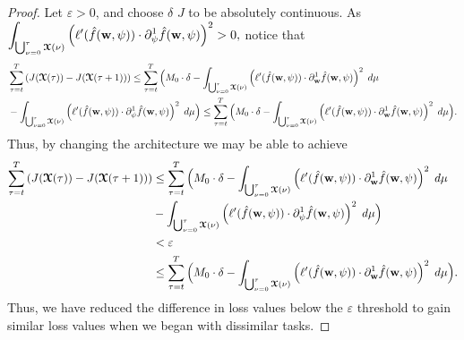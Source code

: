 \begin{proof}
    Let $\varepsilon >0$, and choose $\delta$ $J$ to be absolutely continuous. As  $\displaystyle\int_{\bigcup_{\nu = 0}^\tau\boldsymbol{\mathcal{X}}(\nu)} \left(\ell'(\hat{f}(\boldsymbol{\mathrm{w}},\psi))\cdot \partial_{\psi}^1 \hat{f}(\boldsymbol{\mathrm{w}},\psi)\right)^2  >0,$
    notice that
    {\small \begin{align*}
         & \sum_{\tau = t}^{T} \left(J(\boldsymbol{\mathcal{X}}(\tau)) - J(\boldsymbol{\mathcal{X}}(\tau+1))\right)
         \leq \sum_{\tau =t}^{T} \Big( M_0\cdot \delta - \displaystyle\int_{\bigcup_{\nu = 0}^\tau\boldsymbol{\mathcal{X}}(\nu)} \left(\ell'(\hat{f}(\boldsymbol{\mathrm{w}},\psi))\cdot \partial_{\boldsymbol{\mathrm{w}}}^1 \hat{f}(\boldsymbol{\mathrm{w}},\psi)\right)^2 \hspace{1mm}  d\mu\\
        & -\displaystyle\int_{\bigcup_{\nu = 0}^\tau\boldsymbol{\mathcal{X}}(\nu)} \left(\ell'(\hat{f}(\boldsymbol{\mathrm{w}},\psi))\cdot \partial_{\psi}^1 \hat{f}(\boldsymbol{\mathrm{w}},\psi)\right)^2 \hspace{1mm}  d\mu \Big) \leq \sum_{\tau =t}^{T} \Big( M_0\cdot \delta - \displaystyle\int_{\bigcup_{\nu = 0}^\tau\boldsymbol{\mathcal{X}}(\nu)} \left(\ell'(\hat{f}(\boldsymbol{\mathrm{w}},\psi))\cdot \partial_{\boldsymbol{\mathrm{w}}}^1 \hat{f}(\boldsymbol{\mathrm{w}},\psi)\right)^2 \hspace{1mm}  d\mu \Big).
    \end{align*} }
    Thus, by changing the architecture we may be able to achieve
    \begin{align*}
         \sum_{\tau = t}^{T} \left(J(\boldsymbol{\mathcal{X}}(\tau)) - J(\boldsymbol{\mathcal{X}}(\tau+1))\right)
        & \leq \sum_{\tau =t}^{T} \Big( M_0\cdot \delta - \displaystyle\int_{\bigcup_{\nu = 0}^\tau\boldsymbol{\mathcal{X}}(\nu)} \left(\ell'(\hat{f}(\boldsymbol{\mathrm{w}},\psi))\cdot \partial_{\boldsymbol{\mathrm{w}}}^1 \hat{f}(\boldsymbol{\mathrm{w}},\psi)\right)^2 \hspace{1mm}  d\mu\\
        & -\displaystyle\int_{\bigcup_{\nu = 0}^\tau\boldsymbol{\mathcal{X}}(\nu)} \left(\ell'(\hat{f}(\boldsymbol{\mathrm{w}},\psi))\cdot \partial_{\psi}^1 \hat{f}(\boldsymbol{\mathrm{w}},\psi)\right)^2 \hspace{1mm}  d\mu \Big)\\
        & <\varepsilon\\
        & \leq \sum_{\tau =t}^{T} \Big( M_0\cdot \delta - \displaystyle\int_{\bigcup_{\nu = 0}^\tau\boldsymbol{\mathcal{X}}(\nu)} \left(\ell'(\hat{f}(\boldsymbol{\mathrm{w}},\psi))\cdot \partial_{\boldsymbol{\mathrm{w}}}^1 \hat{f}(\boldsymbol{\mathrm{w}},\psi)\right)^2 \hspace{1mm}  d\mu \Big).
        \end{align*}
    Thus, we have reduced the difference in loss values below the $\varepsilon$ threshold to gain similar loss values when we began with dissimilar tasks.
\end{proof}

